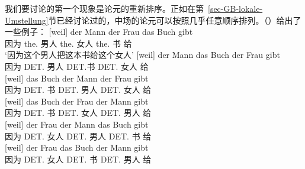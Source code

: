 我们要讨论的第一个现象是论元的重新排序。正如在第~\ref{sec-GB-lokale-Umstellung}节已经讨论过的，中场的论元可以按照几乎任意顺序排列。（）给出了一些例子：
\eal
\label{bsp-GPSG-anordnung}
\ex 
\gll {}[weil] der Mann der Frau das Buch gibt\\
     {}\spacebr{}因为 the.\nom{} 男人 the.\dat{} 女人 the.\acc{} 书 给\\
\glt `因为这个男人把这本书给这个女人'
\ex 
\gll {}[weil] der Mann das Buch der Frau gibt\\
     {}\spacebr{}因为 DET.\nom{} 男人 DET.\acc{}书 DET.\dat{} 女人 给\\
\ex 
\gll {}[weil] das Buch der Mann der Frau gibt\\
{}\spacebr{}因为 DET.\acc{} 书 DET.\nom{} 男人 DET.\dat{} 女人 给\\
\ex 
\gll {}[weil] das Buch der Frau der Mann gibt\\
{}\spacebr{}因为 DET.\acc{} 书 DET.\dat{} 女人 DET.\nom{} 男人 给\\
\ex 
\gll {}[weil] der Frau der Mann das Buch gibt\\
{}\spacebr{}因为 DET.\dat{} 女人 DET.\nom{} 男人 DET.\acc{} 书 给\\
\ex 
\gll {}[weil] der Frau das Buch der Mann gibt\\
{}\spacebr{}因为 DET.\dat{} 女人 DET.\acc{} 书 DET.\nom{} 男人 给\\
\zl

